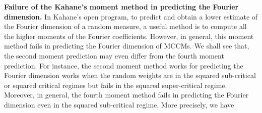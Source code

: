 \documentclass[12pt]{amsart}
\theoremstyle{definition}
\theoremstyle{remark}
\numberwithin{equation}{section}
\begin{document}
{\flushleft \bf Failure of the Kahane's moment method in predicting the Fourier dimension.}
   In Kahane's open program, to predict and obtain a lower estimate of the Fourier dimension of a random measure, a useful method is to compute all the higher moments of the Fourier coefficients.   However,  in general,  this moment method fails in   predicting the Fourier dimension of MCCMs. We shall see that,   the second moment prediction may even differ from  the fourth moment prediction.  For instance,  the second moment method works  for predicting the Fourier dimension  works  when the random weights are in  the squared sub-critical or squared critical regimes but fails  in  the squared super-critical  regime.    Moreover,  in general, the fourth moment method fails in predicting the Fourier dimension even in the squared sub-critical regime.  More precisely, we have 
\end{document}
